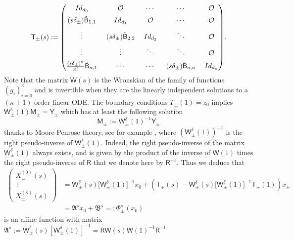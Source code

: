 \documentclass[10pt]{amsart}
\theoremstyle{definition}
\newcommand{\sB}{{\mathsf B}}
\newcommand{\sW}{{\mathsf W}}
\newcommand{\sT}{{\mathsf T}}
\newcommand{\I}{\textup{Id}}\let\Id\I
\begin{document}
\begin{align}
\sT_\pm (s) :=\arraycolsep6.5pt \begin{pmatrix}
\I_{d_0} & \OO & \cdots & \cdots & \OO \\[5pt]
(s\delta_\pm) \tilde \sB_{1,1} & \Id_{d_1} & \OO & \cdots & \OO \\[5pt]
\vdots & (s \delta_\pm) \tilde \sB_{2,2} & \Id_{d_2} & \ddots & \OO \\[5pt]
\vdots & \vdots & \ddots & \ddots & \OO \\[5pt]
\frac{(s\delta_\pm)^\kappa}{\kappa!} \tilde \sB_{\kappa,1} &
\cdots & \cdots & (s \delta_\pm) \tilde \sB_{\kappa,\kappa} & \Id_{d_\kappa}
\end{pmatrix}\!.
\end{align}
Note that the matrix $\sW(s)$ is the Wronskian of the family of
functions $(g_i)_{i=0} ^\kappa$ and is invertible when they are
the linearly independent solutions to a $(\kappa+1)$-order linear
ODE. The boundary conditions $\Gamma_\pm(1)=z_0$ implies
$
\sW_\pm ^\delta (1) \mathsf M_\pm = \mathsf Y_\pm $ which has at least the following solution
\begin{equation*}
\mathsf M_\pm := \sW_\pm ^\delta (1)^{-1}\mathsf Y_\pm
\end{equation*}
thanks to Moore-Penrose theory, see for example \cite{Barata-Hussein}, where $(\sW_\pm ^\delta (1))^{-1}$ is the right pseudo-inverse of $\sW_\pm ^\delta (1)$.
Indeed, the right pseudo-inverse of the matrix $\sW_\pm ^\delta (1)$ always exists, and is given by the product of the inverse of $\sW(1)$ times the right pseudo-inverse of $\mathsf R$ that we denote here by ${\mathsf R}^{-1}$.
Thus we deduce that
\begin{equation}\label{eq:mapping}
\begin{aligned}
\begin{pmatrix}
X^{(0)}_\pm (s) \\\
\vdots \\
X^{(\kappa)}_\pm (s)
\end{pmatrix}
&= \sW_\pm ^\delta (s) \big[\sW_\pm ^\delta
(1)\big]^{-1} x_0
+ \left(\sT_{\pm} (s) - \sW_\pm ^\delta (s) \big[\sW_\pm ^\delta
(1)\big]^{-1} \sT_{\pm} (1) \right) x_\pm \\
& = \mathfrak A^s x_0 + \mathfrak B^s =: \Phi^s_\pm (x_0)
\end{aligned}
\end{equation}
is an affine function with matrix
$\mathfrak A^s:=\sW_\pm ^\delta (s) [\sW_\pm ^\delta (1)]^{-1} = \mathsf R \mathsf W (s) \mathsf W(1)^{-1} \mathsf R^{-1}$
\end{document}
